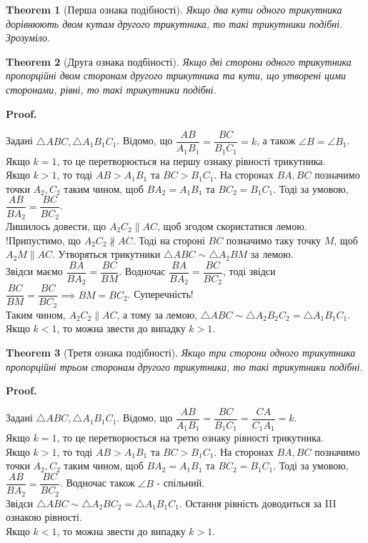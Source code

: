 \documentclass[a4paper, 10pt]{article}
\makeatletter
\theoremstyle{theoremdd}
\newtheorem{theorem}{Theorem}[subsection]
\theoremstyle{theoremdd}
\theoremstyle{theoremdd}
\theoremstyle{theoremdd}
\theoremstyle{theoremdd}
\theoremstyle{theoremdd}
\theoremstyle{theoremdd}
\theoremstyle{theoremdd}
\theoremstyle{theoremdd}
\renewenvironment{proof}[1][Proof.\\]{\par
\pushQED{\hfill \qed}%
\normalfont \topsep6\p@\@plus6\p@\relax
\trivlist
\item\relax
{\bfseries
#1\@addpunct{.}}\hspace\labelsep\ignorespaces
}{%
\popQED\endtrivlist\@endpefalse
}
\makeatother
\begin{document}
\begin{theorem}[Перша ознака подібності]
Якщо два кути одного трикутника дорівнюють двом кутам другого трикутника, то такі трикутники подібні.\\
\textit{Зрозуміло.}
\end{theorem}

\begin{theorem}[Друга ознака подбіності]
Якщо дві сторони одного трикутника пропорційні двом сторонам другого трикутника та кути, що утворені цими сторонами, рівні, то такі трикутники подібні.
\end{theorem}

\begin{proof}
Задані $\triangle ABC, \triangle A_1B_1C_1$. Відомо, що $\dfrac{AB}{A_1B_1} = \dfrac{BC}{B_1C_1} = k$, а також $\angle B = \angle B_1$.\\
Якщо $k = 1$, то це перетворюється на першу ознаку рівності трикутника.\\
Якщо $k > 1$, то тоді $AB > A_1B_1$ та $BC > B_1C_1$. На сторонах $BA,BC$ позначимо точки $A_2,C_2$ таким чином, щоб $BA_2 = A_1B_1$ та $BC_2 = B_1C_1$. Тоді за умовою, $\dfrac{AB}{BA_2} = \dfrac{BC}{BC_2}$.\\
Лишилось довести, що $A_2C_2 \parallel AC$, щоб згодом скористатися лемою.\\
!Припустимо, що $A_2C_2 \not\parallel AC$. Тоді на стороні $BC$ позначимо таку точку $M$, щоб $A_2M \parallel AC$. Утворяться трикутники $\triangle ABC \sim \triangle A_2BM$ за лемою.\\
Звідси маємо $\dfrac{BA}{BA_2} = \dfrac{BC}{BM}$. Водночас $\dfrac{BA}{BA_2} = \dfrac{BC}{BC_2}$, тоді звідси $\dfrac{BC}{BM} = \dfrac{BC}{BC_2} \implies BM = BC_2$. Суперечність!\\
Таким чином,  $A_2C_2 \parallel AC$, а тому за лемою, $\triangle ABC \sim \triangle A_2B_2C_2 = \triangle A_1B_1C_1$.\\
Якщо $k < 1$, то можна звести до випадку $k > 1$.
\end{proof}

\begin{theorem}[Третя ознака подібності]
Якщо три сторони одного трикутника пропорційні трьом сторонам другого трикутника, то такі трикутники подібні.
\end{theorem}

\begin{proof}
Задані $\triangle ABC, \triangle A_1B_1C_1$. Відомо, що $\dfrac{AB}{A_1B_1} = \dfrac{BC}{B_1C_1} = \dfrac{CA}{C_1A_1} = k$.\\
Якщо $k=1$, то це перетворюється на третю ознаку рівності трикутника.\\
Якщо $k > 1$, то тоді $AB > A_1B_1$ та $BC > B_1C_1$. На сторонах $BA,BC$ позначимо точки $A_2,C_2$ таким чином, щоб $BA_2 = A_1B_1$ та $BC_2 = B_1C_1$. Тоді за умовою, $\dfrac{AB}{BA_2} = \dfrac{BC}{BC_2}$. Водночас також $\angle B$ - спільний.\\
Звідси $\triangle ABC \sim \triangle A_2BC_2 = \triangle A_1B_1C_1$. Остання рівність доводиться за III ознакою рівності.\\
Якщо $k < 1$, то можна звести до випадку $k >1$.
\end{proof}
\end{document}

